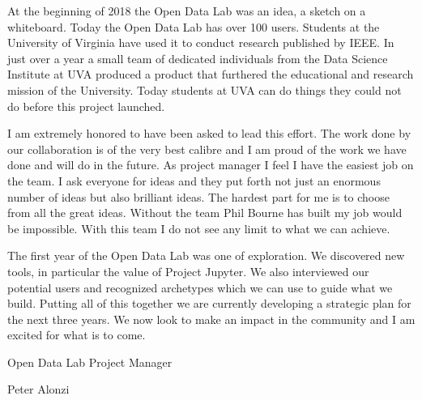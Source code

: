 At the beginning of 2018 the Open Data Lab was an idea, a sketch on a whiteboard. Today the Open Data Lab has over 100 users. Students at the University of Virginia have used it to conduct research published by IEEE. In just over a year a small team of dedicated individuals from the Data Science Institute at UVA produced a product that furthered the educational and research mission of the University. Today students at UVA can do things they could not do before this project launched.

I am extremely honored to have been asked to lead this effort. The work done by our collaboration is of the very best calibre and I am proud of the work we have done and will do in the future. As project manager I feel I have the easiest job on the team. I ask everyone for ideas and they put forth not just an enormous number of ideas but also brilliant ideas. The hardest part for me is to choose from all the great ideas. Without the team Phil Bourne has built my job would be impossible. With this team I do not see any limit to what we can achieve.

The first year of the Open Data Lab was one of exploration. We discovered new tools, in particular the value of Project Jupyter. We also interviewed our potential users and recognized archetypes which we can use to guide what we build. Putting all of this together we are currently developing a strategic plan for the next three years. We now look to make an impact in the community and I am excited for what is to come.

\begin{flushright}

\bigskip

Open Data Lab Project Manager

\bigskip

Peter Alonzi

\end{flushright}
